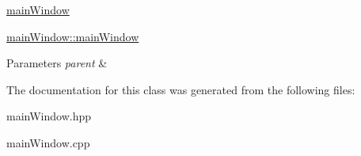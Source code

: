 \hyperlink{classmainWindow}{main\+Window} 

\hyperlink{classmainWindow_a2c09a8baf94af0cc5109fcf2ef97b12a}{main\+Window\+::main\+Window}


\begin{DoxyParams}{Parameters}
{\em parent} & \\
\hline
\end{DoxyParams}


The documentation for this class was generated from the following files\+:\begin{DoxyCompactItemize}
\item 
main\+Window.\+hpp\item 
main\+Window.\+cpp\end{DoxyCompactItemize}
